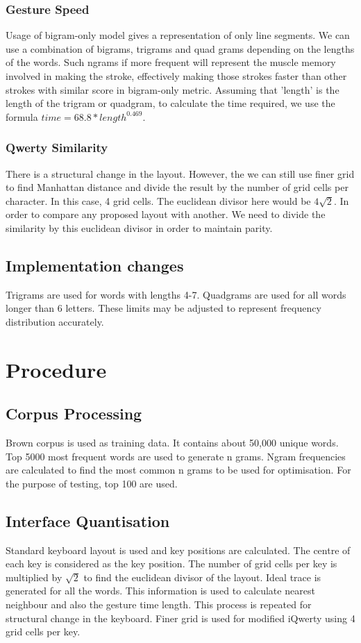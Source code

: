 \documentclass[12pt]{article}
\begin{document}
\subsubsection{Gesture Speed}
Usage of bigram-only model gives a representation of only line segments. We can use a combination of bigrams, trigrams and quad grams depending on the lengths of the words.
Such ngrams if more frequent will represent the muscle memory involved in making the stroke, effectively making those strokes faster than other strokes with similar score in bigram-only metric. Assuming that 'length' is the length of the trigram or quadgram, to calculate the time required, we use the formula $ time = 68.8 * length^{0.469} $. \cite{strokes}

\subsubsection{Qwerty Similarity}
There is a structural change in the layout. However, the we can still use finer grid to find Manhattan distance and divide the result by the number of grid cells per character. In this case, 4 grid cells. The euclidean divisor here would be $4 \sqrt{2}$. In order to compare any proposed layout with another. We need to divide the similarity by this euclidean divisor in order to maintain parity.

\subsection{Implementation changes}
Trigrams are used for words with lengths 4-7.
Quadgrams are used for all words longer than 6 letters.
These limits may be adjusted to represent frequency distribution accurately.

\section{Procedure}
\subsection{Corpus Processing}
Brown corpus is used as training data. It contains about 50,000 unique words.
Top 5000 most frequent words are used to generate n grams.
Ngram frequencies are calculated to find the most common n grams to be used for optimisation. For the purpose of testing, top 100 are used.

\subsection{Interface Quantisation}
Standard keyboard layout is used and key positions are calculated.
The centre of each key is considered as the key position.
The number of grid cells per key is multiplied by $\sqrt{2}$ to find the euclidean divisor of the layout.
Ideal trace is generated for all the words. 
This information is used to calculate nearest neighbour and also the gesture time length.
This process is repeated for structural change in the keyboard. Finer grid is used for modified iQwerty using 4 grid cells per key.
\end{document}
